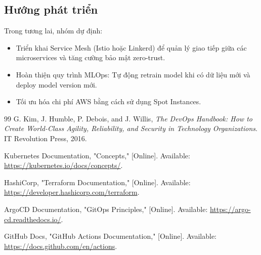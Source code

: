 \documentclass[12pt, a4paper]{article}
\begin{document}
\subsection{Hướng phát triển}
Trong tương lai, nhóm dự định:
\begin{itemize}
    \item Triển khai Service Mesh (Istio hoặc Linkerd) để quản lý giao tiếp giữa các microservices và tăng cường bảo mật zero-trust.
    \item Hoàn thiện quy trình MLOps: Tự động retrain model khi có dữ liệu mới và deploy model version mới.
    \item Tối ưu hóa chi phí AWS bằng cách sử dụng Spot Instances.
\end{itemize}

\renewcommand{\refname}{Tài liệu tham khảo}

\begin{thebibliography}{99}
G. Kim, J. Humble, P. Debois, and J. Willis, \textit{The DevOps Handbook: How to Create World-Class Agility, Reliability, and Security in Technology Organizations}. IT Revolution Press, 2016.

Kubernetes Documentation, "Concepts," [Online]. Available: \url{https://kubernetes.io/docs/concepts/}.

HashiCorp, "Terraform Documentation," [Online]. Available: \url{https://developer.hashicorp.com/terraform}.

ArgoCD Documentation, "GitOps Principles," [Online]. Available: \url{https://argo-cd.readthedocs.io/}.

GitHub Docs, "GitHub Actions Documentation," [Online]. Available: \url{https://docs.github.com/en/actions}.

\end{thebibliography}
\end{document}

